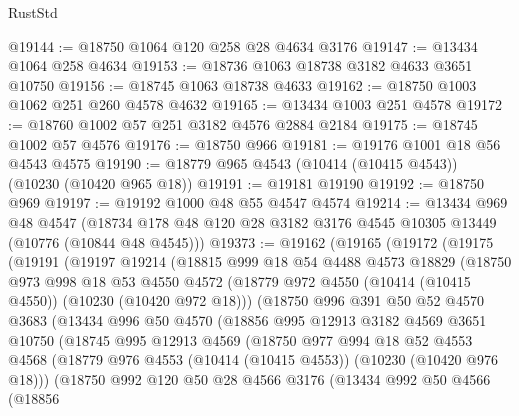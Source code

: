 \begin{lexlean}{RustStd}
\begin{coremodule}
@19144 := @18750 @1064 @120 @258 @28 @4634 @3176
@19147 := @13434 @1064 @258 @4634
@19153 := @18736 @1063 @18738 @3182 @4633 @3651 @10750
@19156 := @18745 @1063 @18738 @4633
@19162 := @18750 @1003 @1062 @251 @260 @4578 @4632
@19165 := @13434 @1003 @251 @4578
@19172 := @18760 @1002 @57 @251 @3182 @4576 @2884 @2184
@19175 := @18745 @1002 @57 @4576
@19176 := @18750 @966
@19181 := @19176 @1001 @18 @56 @4543 @4575
@19190 := @18779 @965 @4543 (@10414 (@10415 @4543)) (@10230 (@10420 @965 @18))
@19191 := @19181 @19190
@19192 := @18750 @969
@19197 := @19192 @1000 @48 @55 @4547 @4574
@19214 := @13434
    @969
    @48
    @4547
    (@18734 @178 @48 @120 @28 @3182 @3176 @4545 @10305 @13449 (@10776 (@10844 @48 @4545)))
@19373 := @19162
    (@19165
      (@19172
        (@19175
          (@19191
            (@19197
              @19214
              (@18815
                @999
                @18
                @54
                @4488
                @4573
                @18829
                (@18750
                  @973
                  @998
                  @18
                  @53
                  @4550
                  @4572
                  (@18779 @972 @4550 (@10414 (@10415 @4550)) (@10230 (@10420 @972 @18)))
                  (@18750
                    @996
                    @391
                    @50
                    @52
                    @4570
                    @3683
                    (@13434
                      @996
                      @50
                      @4570
                      (@18856
                        @995
                        @12913
                        @3182
                        @4569
                        @3651
                        @10750
                        (@18745
                          @995
                          @12913
                          @4569
                          (@18750
                            @977
                            @994
                            @18
                            @52
                            @4553
                            @4568
                            (@18779 @976 @4553 (@10414 (@10415 @4553)) (@10230 (@10420 @976 @18)))
                            (@18750
                              @992
                              @120
                              @50
                              @28
                              @4566
                              @3176
                              (@13434
                                @992
                                @50
                                @4566
                                (@18856

\end{coremodule}
\end{lexlean}

